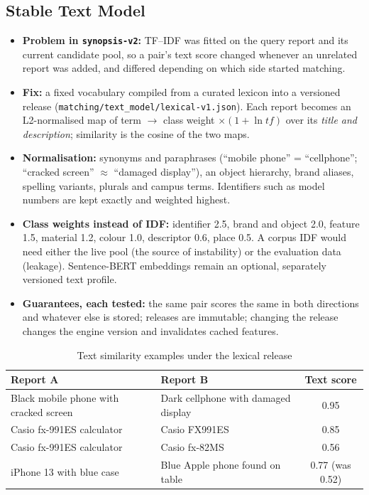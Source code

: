 \documentclass[12pt,a4paper,oneside]{report}
\newcommand{\code}[1]{\texttt{#1}}
\begin{document}
\subsection{Stable Text Model}\label{sec:text}
\begin{itemize}
  \item \textbf{Problem in \code{synopsis-v2}:} TF--IDF was fitted on the query report and its current candidate pool, so a pair's text score changed whenever an unrelated report was added, and differed depending on which side started matching.
  \item \textbf{Fix:} a fixed vocabulary compiled from a curated lexicon into a versioned release (\code{matching/text\_model/lexical-v1.json}). Each report becomes an L2-normalised map of term $\rightarrow$ class weight $\times (1 + \ln \mathit{tf})$ over its \emph{title and description}; similarity is the cosine of the two maps.
  \item \textbf{Normalisation:} synonyms and paraphrases (``mobile phone'' = ``cellphone''; ``cracked screen'' $\approx$ ``damaged display''), an object hierarchy, brand aliases, spelling variants, plurals and campus terms. Identifiers such as model numbers are kept exactly and weighted highest.
  \item \textbf{Class weights instead of IDF:} identifier 2.5, brand and object 2.0, feature 1.5, material 1.2, colour 1.0, descriptor 0.6, place 0.5. A corpus IDF would need either the live pool (the source of instability) or the evaluation data (leakage). Sentence-BERT embeddings \cite{sbert} remain an optional, separately versioned text profile.
  \item \textbf{Guarantees, each tested:} the same pair scores the same in both directions and whatever else is stored; releases are immutable; changing the release changes the engine version and invalidates cached features.
\end{itemize}
\begin{table}[H]
\centering\small
\caption{Text similarity examples under the lexical release}
\begin{tabularx}{\textwidth}{X X c}
\toprule
Report A & Report B & Text score\\
\midrule
Black mobile phone with cracked screen & Dark cellphone with damaged display & 0.95\\
Casio fx-991ES calculator & Casio FX991ES & 0.85\\
Casio fx-991ES calculator & Casio fx-82MS & 0.56\\
iPhone 13 with blue case & Blue Apple phone found on table & 0.77 (was 0.52)\\
\bottomrule
\end{tabularx}
\end{table}
\end{document}
